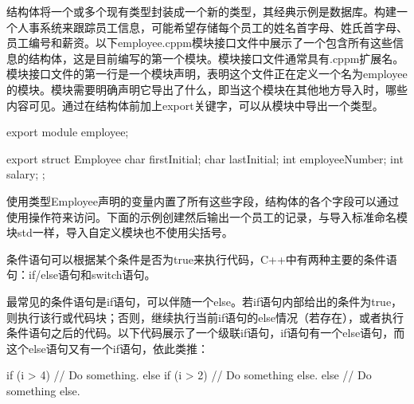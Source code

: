 
结构体将一个或多个现有类型封装成一个新的类型，其经典示例是数据库。构建一个人事系统来跟踪员工信息，可能希望存储每个员工的姓名首字母、姓氏首字母、员工编号和薪资。以下employee.cppm模块接口文件中展示了一个包含所有这些信息的结构体，这是目前编写的第一个模块。模块接口文件通常具有.cppm扩展名。模块接口文件的第一行是一个模块声明，表明这个文件正在定义一个名为employee的模块。模块需要明确声明它导出了什么，即当这个模块在其他地方导入时，哪些内容可见。通过在结构体前加上export关键字，可以从模块中导出一个类型。

\begin{cpp}
export module employee;

export struct Employee {
    char firstInitial;
    char lastInitial;
    int employeeNumber;
    int salary;
};
\end{cpp}

使用类型Employee声明的变量内置了所有这些字段，结构体的各个字段可以通过使用操作符来访问。下面的示例创建然后输出一个员工的记录，与导入标准命名模块std一样，导入自定义模块也不使用尖括号。



条件语句可以根据某个条件是否为true来执行代码，C++中有两种主要的条件语句：if/else语句和switch语句。


最常见的条件语句是if语句，可以伴随一个else。若if语句内部给出的条件为true，则执行该行或代码块；否则，继续执行当前if语句的else情况（若存在），或者执行条件语句之后的代码。以下代码展示了一个级联if语句，if语句有一个else语句，而这个else语句又有一个if语句，依此类推：

\begin{cpp}
if (i > 4) {
    // Do something.
} else if (i > 2) {
    // Do something else.
} else {
    // Do something else.
}
\end{cpp}

